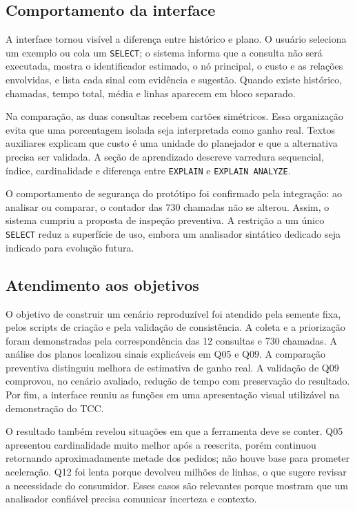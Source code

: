 \documentclass{UNESC}
\newcommand{\codigo}[1]{\texttt{#1}}
\begin{document}
\subsection{Comportamento da interface}

A interface tornou visível a diferença entre histórico e plano. O usuário seleciona um exemplo ou cola um \codigo{SELECT}; o sistema informa que a consulta não será executada, mostra o identificador estimado, o nó principal, o custo e as relações envolvidas, e lista cada sinal com evidência e sugestão. Quando existe histórico, chamadas, tempo total, média e linhas aparecem em bloco separado.

Na comparação, as duas consultas recebem cartões simétricos. Essa organização evita que uma porcentagem isolada seja interpretada como ganho real. Textos auxiliares explicam que custo é uma unidade do planejador e que a alternativa precisa ser validada. A seção de aprendizado descreve varredura sequencial, índice, cardinalidade e diferença entre \codigo{EXPLAIN} e \codigo{EXPLAIN ANALYZE}.

O comportamento de segurança do protótipo foi confirmado pela integração: ao analisar ou comparar, o contador das 730 chamadas não se alterou. Assim, o sistema cumpriu a proposta de inspeção preventiva. A restrição a um único \codigo{SELECT} reduz a superfície de uso, embora um analisador sintático dedicado seja indicado para evolução futura.

\subsection{Atendimento aos objetivos}

O objetivo de construir um cenário reproduzível foi atendido pela semente fixa, pelos scripts de criação e pela validação de consistência. A coleta e a priorização foram demonstradas pela correspondência das 12 consultas e 730 chamadas. A análise dos planos localizou sinais explicáveis em Q05 e Q09. A comparação preventiva distinguiu melhora de estimativa de ganho real. A validação de Q09 comprovou, no cenário avaliado, redução de tempo com preservação do resultado. Por fim, a interface reuniu as funções em uma apresentação visual utilizável na demonstração do TCC.

O resultado também revelou situações em que a ferramenta deve se conter. Q05 apresentou cardinalidade muito melhor após a reescrita, porém continuou retornando aproximadamente metade dos pedidos; não houve base para prometer aceleração. Q12 foi lenta porque devolveu milhões de linhas, o que sugere revisar a necessidade do consumidor. Esses casos são relevantes porque mostram que um analisador confiável precisa comunicar incerteza e contexto.
\end{document}
